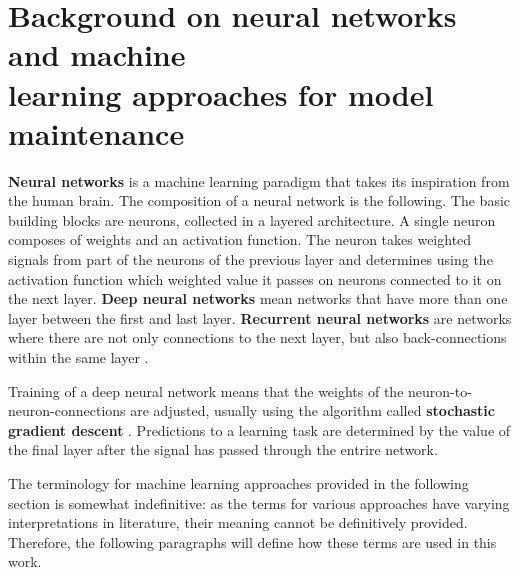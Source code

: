 \section[Background on neural networks and machine learning approaches for model maintenance]{Background on neural networks and machine\\ learning approaches for model maintenance}

\textbf{Neural networks} is a machine learning paradigm that takes its inspiration from the human brain. The composition of a neural network is the following. The basic building blocks are neurons, collected in a layered architecture. A single neuron composes of weights and an activation function. The neuron takes weighted signals from part of the neurons of the previous layer and determines using the activation function which weighted value it passes on neurons connected to it on the next layer. \textbf{Deep neural networks} mean networks that have more than one layer between the first and last layer. \textbf{Recurrent neural networks} are networks where there are not only connections to the next layer, but also back-connections within the same layer \cite{ben-nunDemystifyingParallelDistributed2019}. 

 Training of a deep neural network means that the weights of the neuron-to-neuron-connections are adjusted, usually using the algorithm called \textbf{stochastic gradient descent} \cite{ben-nunDemystifyingParallelDistributed2019}. Predictions to a learning task are determined by the value of the final layer after the signal has passed through the entrire network.

The terminology for machine learning approaches provided in the following section is somewhat indefinitive: as the terms for various approaches have varying interpretations in literature, their meaning cannot be definitively provided. Therefore, the following paragraphs will define how these terms are used in this work.

